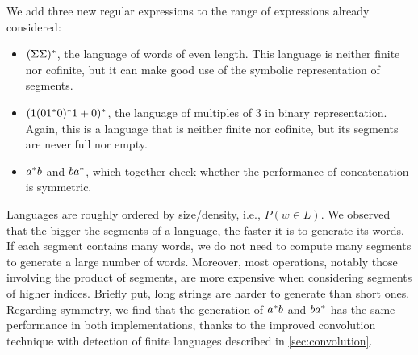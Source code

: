 We add three new regular expressions to the range of expressions already considered:
\begin{itemize}
\item $(\Sigma\Sigma)^*$, the language of words of even
  length. This language is neither finite nor cofinite, but it can make
  good use of the symbolic representation of segments.
\item $(1 (01^*0)^*1 +{0})^*$, the language
  of multiples of 3 in binary representation. Again, this is a language that is neither
  finite nor cofinite, but its segments are never full nor empty.
\item $a^*b$ and $ba^*$, which together check whether
  the performance of {concatenation} is symmetric.
\end{itemize}

Languages are roughly ordered by size/density, i.e., $P (w\in L)$. We
observed that the bigger the segments of a language, the faster it is
to generate its words.  If each segment contains many words, we do not
need to compute many segments to generate a large number of words.
Moreover, most operations, notably those involving the product of
segments, are more expensive when considering segments of higher
indices. Briefly put, long strings are harder to generate than short
ones.
%
Regarding symmetry, we find that the generation of $a^*b$ and
$ba^*$ has the same performance in both implementations,
thanks to the improved convolution technique
with detection of finite languages described in \cref{sec:convolution}.



